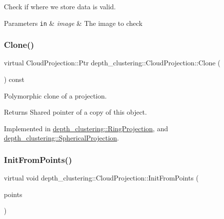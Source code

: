 Check if where we store data is valid. 


\begin{DoxyParams}[1]{Parameters}
\mbox{\tt in}  & {\em image} & The image to check \\
\hline
\end{DoxyParams}
\mbox{\label{classdepth__clustering_1_1CloudProjection_ae06ff9699c1a37c535b39fa6f722fa2e}} 
\subsubsection{\texorpdfstring{Clone()}{Clone()}}
{\footnotesize\ttfamily virtual Cloud\+Projection\+::\+Ptr depth\+\_\+clustering\+::\+Cloud\+Projection\+::\+Clone (\begin{DoxyParamCaption}{ }\end{DoxyParamCaption}) const\hspace{0.3cm}{\ttfamily [pure virtual]}}



Polymorphic clone of a projection. 

\begin{DoxyReturn}{Returns}
Shared pointer of a copy of this object. 
\end{DoxyReturn}


Implemented in \hyperlink{classdepth__clustering_1_1RingProjection_a433c0ee114b89b6c78ad4c471d120153}{depth\+\_\+clustering\+::\+Ring\+Projection}, and \hyperlink{classdepth__clustering_1_1SphericalProjection_a1b7870502497310666b2909701906470}{depth\+\_\+clustering\+::\+Spherical\+Projection}.

\mbox{\label{classdepth__clustering_1_1CloudProjection_aab5fa3b7362b2c4297bf9b445ccc7ff8}} 
\subsubsection{\texorpdfstring{Init\+From\+Points()}{InitFromPoints()}}
{\footnotesize\ttfamily virtual void depth\+\_\+clustering\+::\+Cloud\+Projection\+::\+Init\+From\+Points (\begin{DoxyParamCaption}\item[{const Rich\+Point\+::\+Aligned\+Vector \&}]{points }\end{DoxyParamCaption})\hspace{0.3cm}{\ttfamily [pure virtual]}}



